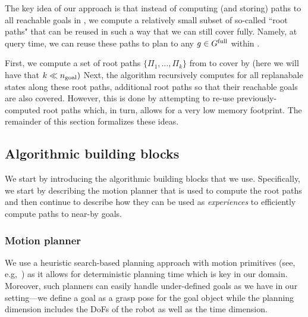 \documentclass[conference]{IEEEtran}
\begin{document}

The key idea of our approach is that instead of computing (and storing) paths to all reachable goals in \Gfull, we compute a relatively small subset of so-called ``root paths" that can be reused in such a way that we can still cover \Gfull fully. Namely, at query time, we can reuse these paths to plan to any $g\in G^{\textrm{full}}$ within \Tbound.


First, we compute a set of root paths $\{\Pi_1, \ldots, \Pi_k \}$ from \Shome to cover \Gfull by \Shome (here we will have that $k \ll n_{\rm goal})$ 
%
Next, the algorithm recursively computes for all replanabale states along these root paths, additional root paths so that their reachable goals are also covered. However, this is done by attempting to re-use previously-computed root paths which, in turn, allows for a very low memory footprint.
%
%
The remainder of this section formalizes these ideas.

\subsection{Algorithmic building blocks}
We start by introducing the algorithmic building blocks that we use.
Specifically, we start by describing the motion planner that is used to compute the root paths 
and then continue to describe how they can be used as \emph{experiences} to efficiently compute paths to near-by goals.
\subsubsection{Motion planner}
We use a heuristic search-based planning approach with motion primitives (see, e.g,~\cite{CCL10,CSCL11,LF09})
as it allows for deterministic planning time which is key in our domain.
Moreover, such planners can easily handle under-defined goals as we have in our setting---we define a goal as a grasp pose for the goal object while the planning dimension includes the DoFs of the robot as well as the time dimension.
\end{document}
